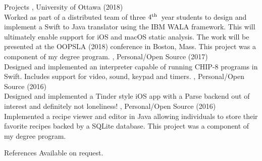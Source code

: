 \documentclass{resume}
\newcommand{\fourth}{$4^{\mbox{\scriptsize th}}$\ }
\begin{document}



\begin{category}{Projects}
, University of Ottawa (2018)\\
Worked as part of a distributed team of three \fourth year students to
design and implement a Swift to Java translator using the IBM WALA framework.
This will ultimately enable support for iOS and macOS static analysis.
The work will be presented at the OOPSLA (2018) conference in Boston, Mass.
This project was a component of my degree program.
, Personal/Open Source (2017)\\
Designed and implemented an interpreter capable of running CHIP-8 programs in Swift.
Includes support for video, sound, keypad and timers.
, Personal/Open Source (2016)\\
Designed and implemented a Tinder style iOS app with a Parse backend out of interest and
definitely not loneliness!
, Personal/Open Source (2016)\\
Implemented a recipe viewer and editor in Java allowing individuals to store their
favorite recipes backed by a SQLite database.
This project was a component of my degree program.
\end{category}


\begin{category}{References}
\citemnobullet Available on request.
\end{category}
\end{document}
